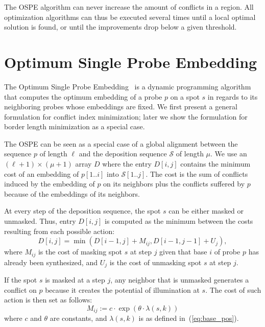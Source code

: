 \documentclass[runningheads]{llncs}
\begin{document}
The OSPE algorithm can never increase the amount of conflicts in a region.
All optimization algorithms can thus be executed several times until
a local optimal solution is found, or until the improvements drop below a given threshold.

\section{Optimum Single Probe Embedding}
\label{sec:ospe}

The Optimum Single Probe Embedding~\cite{KAHNG02} is a dynamic programming
algorithm that computes the optimum embedding of a probe $p$ on a spot $s$
in regards to its neighboring probes whose embeddings are fixed. We first present
a general formulation for conflict index minimization; later we show the
formulation for border length minimization as a special case.

The OSPE can be seen as a special case of a global alignment between the
sequence $p$ of length $\ell$ and the deposition sequence $\mathcal{S}$ of length
$\mu$. We use an $(\ell + 1) \times (\mu + 1)$ array $D$ where the entry $D[i,j]$
contains the minimum cost of an embedding of $p[1..i]$ into $\mathcal{S}[1..j]$.
The cost is the sum of conflicts induced by the embedding of $p$ on its neighbors
plus the conflicts suffered by $p$ because of the embeddings of its neighbors.

At every step of the deposition sequence, the spot $s$ can be either masked or
unmasked. Thus, entry $D[i,j]$ is computed as the minimum between the costs
resulting from each possible action:
\begin{equation}
D[i,j] = \min (D[i-1,j] + M_{ij}, D[i-1,j-1] + U_{j}),
\end{equation}
where $M_{ij}$ is the cost of masking spot $s$ at step $j$ given that base $i$ of
probe $p$ has already been synthesized, and $U_{j}$ is the cost of unmasking spot
$s$ at step $j$.

If the spot $s$ is masked at a step $j$, any neighbor that is unmasked generates
a conflict on $p$ because it creates the potential of illumination at $s$. The
cost of such action is then set as follows:
\begin{equation}
M_{ij} := c \cdot \exp{\left(\theta \cdot \lambda(s,k)\right)}
\end{equation}
where $c$ and $\theta$ are constants, and $\lambda(s,k)$ is as defined
in~(\ref{eq:base_pos}).
\end{document}

